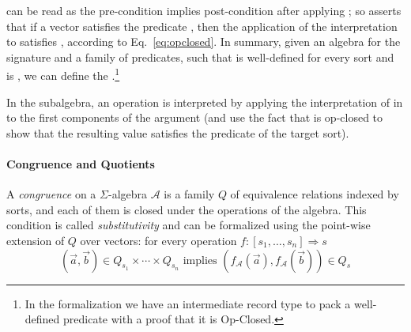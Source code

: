 \noindent
\AgdaSymbol{(}\AgdaSymbol{)}\AgdaSpace{}
can be read as the pre-condition  implies post-condition
 after applying ; so
\AgdaSpace{}\AgdaSpace{}
asserts that if a vector  satisfies the predicate
, then the application of the interpretation
\AgdaSpace{}%
\AgdaSpace{}%
\AgdaSpace{}%
 to  satisfies
, according to Eq.~\eqref{eq:opclosed}.  In summary,
given an algebra  for the signature  and a
family  of predicates, such that
\AgdaSpace{} is well-defined for every sort
 and  is , we can
define the
\AgdaSpace{}\AgdaSpace{}.\footnote{In
  the formalization we have an intermediate record type
   to pack a well-defined predicate with a proof
  that it is Op-Closed.}

\noindent In the subalgebra, an operation  is interpreted by
applying the interpretation of  in  to the first components of
the argument (and use the fact that  is op-closed to show that
the resulting value satisfies the predicate of the target sort).

\paragraph*{Congruence and Quotients}
A \emph{congruence} on a $\Sigma$-algebra
$\mathcal{A}$ is a family
$Q$ of equivalence relations indexed by sorts, and each of them is
closed under the operations of the algebra. This condition is called
\emph{substitutivity} and can be formalized using the point-wise
extension of $Q$ over vectors: for every operation $ f : [s_1,
\ldots,s_n] \Rightarrow s$
\begin{equation}
  (\vec{a},\vec{b}) \in Q_{s_1} \times \cdots \times Q_{s_n} \text{ implies }
 (f_{\mathcal{A}}(\vec{a}) , f_{\mathcal{A}}(\vec{b})) \in Q_s\label{eq:congcond}
\end{equation} 


